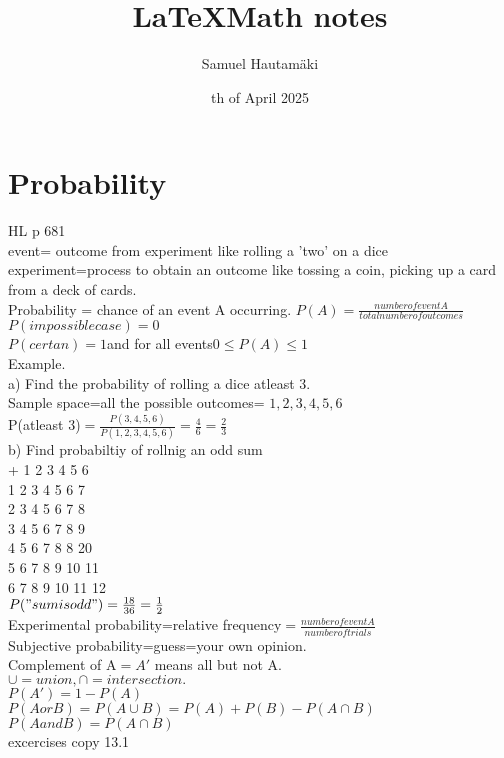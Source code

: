 \documentclass{article}
\title{\LaTeX Math notes}
\author{Samuel Hautamäki}
\date{th of April 2025}
\begin{document}
  \maketitle
   
  \section{Probability}
  HL p 681\\
  event= outcome from experiment like rolling a 'two' on a dice\\
  experiment=process to obtain an outcome like tossing a coin, picking up a card from a deck of cards.\\
  Probability = chance of an event A occurring. $P(A)=\frac{number of event A}{total number of outcomes}$\\
  $P(impossible case)=0$\\
  $P(certan)=1 $and for all events$ 0\leq P(A)\leq 1$\\
  Example.\\
  a) Find the probability of rolling a dice atleast 3.\\
  Sample space=all the possible outcomes= ${1,2,3,4,5,6}$\\
  P(atleast 3)$=\frac{P(3,4,5,6)}{P(1,2,3,4,5,6)}=\frac{4}{6}=\frac{2}{3}$\\
  b) Find probabiltiy of rollnig an odd sum\\
  + 1 2 3 4 5 6\\
  1 2 3 4 5 6 7\\
  2 3 4 5 6 7 8\\
  3 4 5 6 7 8 9\\
  4 5 6 7 8 8 20\\
  5 6 7 8 9 10 11\\
  6 7 8 9 10 11 12\\
  $P("sum is odd")=\frac{18}{36}=\frac{1}{2}$\\
  Experimental probability=relative frequency$=\frac{number of event A}{number of trials}$\\
  Subjective probability=guess=your own opinion.\\
  Complement of A$=A'$ means all but not A.\\
  $\cup = union, \cap = intersection.$\\
  $P(A')=1-P(A)$\\
  $P(A or B)=P(A \cup B)=P(A)+P(B)-P(A\cap B)$\\
  $P(A and B)=P(A\cap B)$\\
  excercises copy 13.1\\
\end{document}
